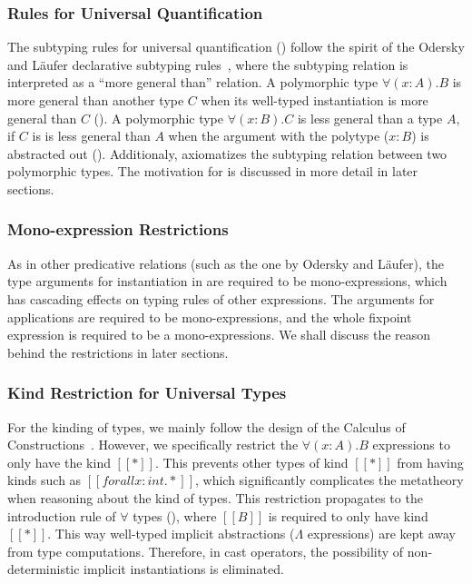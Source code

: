 \subsubsection{Rules for Universal Quantification}
The subtyping rules for universal quantification () follow
the spirit of the Odersky and L\"aufer declarative subtyping rules~\cite{oderskylaufer,DunfieldJoshua2013Caeb},
where the subtyping relation is interpreted as a ``more general than'' relation.
A polymorphic type $\forall (x:A). B$
is more general than another type $C$ when its well-typed
instantiation is more general than $C$ (). A polymorphic
type $\forall (x:B). C$ is less general than a type $A$,
if $C$ is is less general than $A$ when the argument with the polytype ($x:B$)
is abstracted out (). Additionaly, 
axiomatizes the subtyping relation between two polymorphic types.
The motivation for  is discussed in more detail in later sections.

\subsubsection{Mono-expression Restrictions}
As in other predicative relations (such as the one by Odersky and L\"aufer),
the type arguments for instantiation in  are
required to be mono-expressions, which has cascading effects on typing rules of
other expressions. The arguments for applications are required to be
mono-expressions, and the whole fixpoint expression is required to be a
mono-expressions. We shall
discuss the reason behind the restrictions in later sections.

\subsubsection{Kind Restriction for Universal Types}
\label{sec:kind-restriction}

For the kinding of types, we mainly follow the design of the Calculus of
Constructions~\cite{CoquandThierry1988Tcoc}. However, we specifically restrict
the $\forall (x : A). B$
expressions to only have the kind $[[*]]$. This prevents other types of kind
$[[*]]$ from having kinds such as $[[forall x : int. *]]$,
which significantly complicates the metatheory when reasoning about the kind of types.
This restriction propagates to the introduction rule of $\forall$ types (),
where $[[B]]$ is required to only have kind $[[*]]$.
This way well-typed implicit abstractions ($\Lambda$ expressions) are kept away
from type computations. Therefore, in cast operators,
the possibility of non-deterministic implicit instantiations is eliminated.

